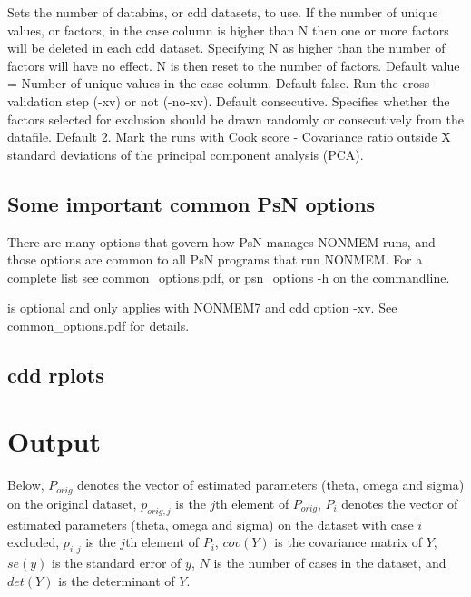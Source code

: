 \begin{optionlist}
Sets the number of databins, or cdd datasets, to use. If the number of unique values, or factors, in the case column is higher than N then one or more factors will be deleted in each cdd dataset. Specifying N as higher than the number of factors will have no effect. N is then reset to the number of factors. Default value = Number of unique values in the case column. 
\nextopt
{}
Default false. Run the cross-validation step (-xv) or not (-no-xv). 
\nextopt
{}
Default consecutive. Specifies whether the factors selected for exclusion should be drawn randomly or consecutively from the datafile. 
\nextopt
{}
Default 2. Mark the runs with Cook score - Covariance ratio outside X standard deviations of
the principal component analysis (PCA). 
\nextopt
\end{optionlist}

\subsection{Some important common PsN options}
There are many options that govern how PsN manages NONMEM runs, and
those options are common to all PsN programs that run NONMEM.
For a complete list see common\_options.pdf, 
or psn\_options -h on the commandline.

\begin{optionlist}
is optional and only applies with NONMEM7 and cdd option -xv. 
See common\_options.pdf for details.
\nextopt
\end{optionlist}

\subsection{cdd rplots}
\newcommand{\rplotsconditions}{
If option -rplots is set $>=1$, a plot with Covariance ratios
vs Cook scores for each case, e.g. ID, will be generated. 
The default cdd rplots template 
requires no special R libraries.
If no pdf is generated,
see the .Rout file in the main run directory for error messages.}


\section{Output}

Below, $P_{orig}$ denotes the vector of estimated parameters (theta, omega and sigma)
on the original dataset, $p_{orig,j}$ is the $j$th element of $P_{orig}$,
$P_{i}$ denotes the vector of estimated parameters (theta, omega and sigma)
on the dataset with case $i$ excluded, $p_{i,j}$ is the $j$th element of $P_{i}$,
$cov(Y)$ is the covariance matrix of $Y$,
$se(y)$ is the standard error of $y$,
$N$ is the number of cases in the dataset,
and
$det(Y)$ is the determinant of $Y$.

